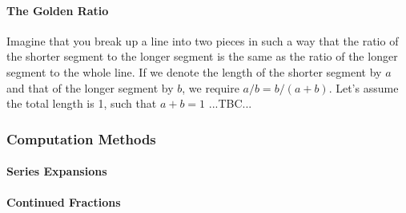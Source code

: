 
 
\paragraph{The Golden Ratio}
Imagine that you break up a line into two pieces in such a way that the ratio of the shorter segment to the longer segment is the same as the ratio of the longer segment to the whole line. If we denote the length of the shorter segment by $a$ and that of the longer segment by $b$, we require $a/b = b/(a+b)$. Let's assume the total length is 1, such that $a+b=1$ ...TBC...







\subsubsection{Computation Methods}

\paragraph{Series Expansions}

\paragraph{Continued Fractions}





